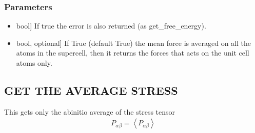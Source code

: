 \documentclass[a4paper,11pt,english]{sphinxmanual}
\begin{document}
\begin{fulllineitems}
\begin{fulllineitems}
\subsubsection{Parameters}
\label{\detokenize{apireference:id3}}\begin{itemize}
\item {} \begin{description}
\sphinxlineitem{get\_error}{[}bool{]}
\sphinxAtStartPar
If true the error is also returned (as get\_free\_energy).

\end{description}

\item {} \begin{description}
\sphinxlineitem{in\_unit\_cell}{[}bool, optional{]}
\sphinxAtStartPar
If True (default True) the mean force is averaged on all the atoms in the supercell,
then it returns the forces that acts on the unit cell atoms only.

\end{description}

\end{itemize}

\end{fulllineitems}


\begin{fulllineitems}
\label{\detokenize{apireference:sscha.Ensemble.Ensemble.get_average_stress}}
\pysigstartsignatures
{}
\pysigstopsignatures

\subsection{GET THE AVERAGE STRESS}
\label{\detokenize{apireference:get-the-average-stress}}
\sphinxAtStartPar
This gets only the ab\sphinxhyphen{}initio average of the stress tensor
\begin{equation*}
\begin{split}P_{\alpha\beta} = \left<P_{\alpha\beta}\right>\end{split}
\end{equation*}
\end{fulllineitems}



\end{fulllineitems}
\end{document}
